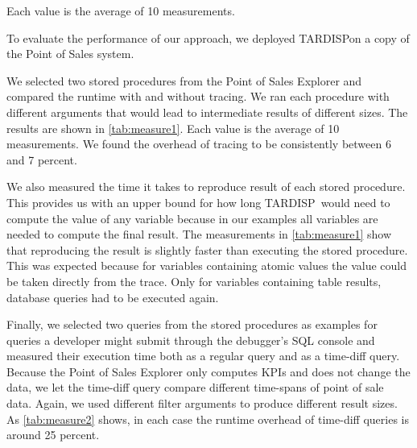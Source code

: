 \documentclass[english,conference]{IEEEtran}
\newcommand{\todo}[2][]{\pdfmargincomment[author={#1}]{#2}}
\newcommand{\tool}{TAR\-DISP}
\begin{document}
Each value is the average of 10 measurements.

To evaluate the performance of our approach, we deployed \tool on a copy of the Point of Sales system.

We selected two stored procedures from the Point of Sales Explorer and compared the runtime with and without tracing.
We ran each procedure with different arguments that would lead to intermediate results of different sizes.
The results are shown in \cref{tab:measure1}.
Each value is the average of 10 measurements.
We found the overhead of tracing to be consistently between 6 and 7 percent.


We also measured the time it takes to reproduce result of each stored procedure.
This provides us with an upper bound for how long \tool\ would need to compute the value of any variable because in our examples all variables are needed to compute the final result.
The measurements in \cref{tab:measure1} show that reproducing the result is slightly faster than executing the stored procedure.
This was expected because for variables containing atomic values the value could be taken directly from the trace.
Only for variables containing table results, database queries had to be executed again.

Finally, we selected two queries from the stored procedures as examples for queries a developer might submit through the debugger's SQL console and measured their execution time both as a regular query and as a time-diff query.
Because the Point of Sales Explorer only computes KPIs and does not change the data, we let the time-diff query compare different time-spans of point of sale data\todo{is this disclaimer needed?}.
Again, we used different filter arguments to produce different result sizes.
As \cref{tab:measure2} shows, in each case the runtime overhead of time-diff queries is around 25 percent.
\end{document}
